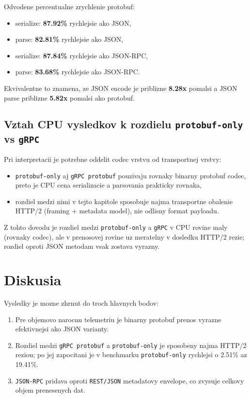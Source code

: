 \documentclass[12pt,a4paper]{report}
\begin{document}
Odvodene percentualne zrychlenie protobuf:
\begin{itemize}
  \item serialize: \textbf{87.92\%} rychlejsie ako JSON,
  \item parse: \textbf{82.81\%} rychlejsie ako JSON,
  \item serialize: \textbf{87.84\%} rychlejsie ako JSON-RPC,
  \item parse: \textbf{83.68\%} rychlejsie ako JSON-RPC.
\end{itemize}

Ekvivalentne to znamena, ze JSON encode je priblizne \textbf{8.28x} pomalsi
a JSON parse priblizne \textbf{5.82x} pomalsi ako protobuf.

\subsection{Vztah CPU vysledkov k rozdielu \texttt{protobuf-only} vs \texttt{gRPC}}

Pri interpretacii je potrebne oddelit codec vrstvu od transportnej vrstvy:
\begin{itemize}
  \item \texttt{protobuf-only} aj \texttt{gRPC protobuf} pouzivaju rovnaky
  binarny protobuf codec, preto je CPU cena serializacie a parsovania
  prakticky rovnaka,
  \item rozdiel medzi nimi v tejto kapitole sposobuje najma transportne
  obalenie HTTP/2 (framing + metadata model), nie odlisny format payloadu.
\end{itemize}

Z tohto dovodu je rozdiel medzi \texttt{protobuf-only} a \texttt{gRPC}
v CPU rovine maly (rovnaky codec), ale v prenosovej rovine uz meratelny
v dosledku HTTP/2 rezie; rozdiel oproti JSON metodam vsak zostava vyrazny.

\section{Diskusia}

Vysledky je mozne zhrnut do troch hlavnych bodov:
\begin{enumerate}
  \item Pre objemovo narocnu telemetriu je binarny protobuf prenos
  vyrazne efektivnejsi ako JSON varianty.
  \item Rozdiel medzi \texttt{gRPC protobuf} a \texttt{protobuf-only}
  je sposobeny najma HTTP/2 reziou; po jej zapocitani je v benchmarku
  \texttt{protobuf-only} rychlejsi o 2.51\% az 19.41\%.
  \item \texttt{JSON-RPC} pridava oproti \texttt{REST/JSON}
  metadatovy envelope, co zvysuje celkovy objem prenesenych dat.
\end{enumerate}
\end{document}
